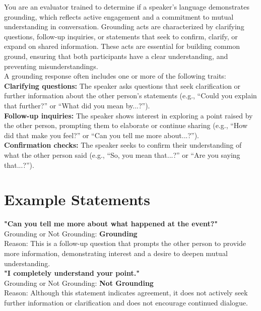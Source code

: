 \begin{tcolorbox}[title=Grounding Act Classification, myboxstyle, breakable]
You are an evaluator trained to determine if a speaker’s language demonstrates grounding, which reflects active engagement and a commitment to mutual understanding in conversation. Grounding acts are characterized by clarifying questions, follow-up inquiries, or statements that seek to confirm, clarify, or expand on shared information. These acts are essential for building common ground, ensuring that both participants have a clear understanding, and preventing misunderstandings. \\

A grounding response often includes one or more of the following traits: \\

\textbf{Clarifying questions:} The speaker asks questions that seek clarification or further information about the other person’s statements (e.g., “Could you explain that further?” or “What did you mean by...?”). \\

\textbf{Follow-up inquiries:} The speaker shows interest in exploring a point raised by the other person, prompting them to elaborate or continue sharing (e.g., “How did that make you feel?” or “Can you tell me more about...?”). \\

\textbf{Confirmation checks:} The speaker seeks to confirm their understanding of what the other person said (e.g., “So, you mean that...?” or “Are you saying that...?”). \\

\section*{Example Statements}

\textbf{"Can you tell me more about what happened at the event?"} \\
Grounding or Not Grounding: \textbf{Grounding} \\
Reason: This is a follow-up question that prompts the other person to provide more information, demonstrating interest and a desire to deepen mutual understanding. \\

\textbf{"I completely understand your point."} \\
Grounding or Not Grounding: \textbf{Not Grounding} \\
Reason: Although this statement indicates agreement, it does not actively seek further information or clarification and does not encourage continued dialogue.\\


\end{tcolorbox}
